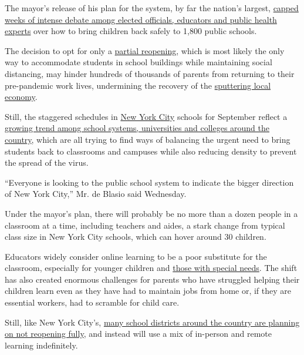 The mayor's release of his plan for the system, by far the nation's
largest,
\href{https://www.nytimes3xbfgragh.onion/2020/07/06/nyregion/nyc-school-reopening-plan.html}{capped
weeks of intense debate among elected officials, educators and public
health experts} over how to bring children back safely to 1,800 public
schools.

The decision to opt for only a
\href{https://www.nytimes3xbfgragh.onion/2020/07/17/nyregion/phase-4-nyc-reopen.html}{partial
reopening}, which is most likely the only way to accommodate students in
school buildings while maintaining social distancing, may hinder
hundreds of thousands of parents from returning to their pre-pandemic
work lives, undermining the recovery of the
\href{https://www.nytimes3xbfgragh.onion/2020/07/07/nyregion/nyc-unemployment.html}{sputtering
local economy}.

Still, the staggered schedules in
\href{https://www.nytimes3xbfgragh.onion/article/new-york-phase-reopening.html}{New
York City} schools for September reflect a
\href{https://www.nytimes3xbfgragh.onion/2020/06/26/us/coronavirus-schools-reopen-fall.html}{growing
trend among school systems, universities and colleges around the
country}, which are all trying to find ways of balancing the urgent need
to bring students back to classrooms and campuses while also reducing
density to prevent the spread of the virus.

``Everyone is looking to the public school system to indicate the bigger
direction of New York City,'' Mr. de Blasio said Wednesday.

Under the mayor's plan, there will probably be no more than a dozen
people in a classroom at a time, including teachers and aides, a stark
change from typical class size in New York City schools, which can hover
around 30 children.

Educators widely consider online learning to be a poor substitute for
the classroom, especially for younger children and
\href{https://www.nytimes3xbfgragh.onion/2020/04/16/nyregion/special-education-coronavirus-nyc.html}{those
with special needs}. The shift has also created enormous challenges for
parents who have struggled helping their children learn even as they
have had to maintain jobs from home or, if they are essential workers,
had to scramble for child care.

Still, like New York City's,
\href{https://www.nytimes3xbfgragh.onion/2020/06/26/us/coronavirus-schools-reopen-fall.html}{many
school districts around the country are planning on not reopening
fully}, and instead will use a mix of in-person and remote learning
indefinitely.


